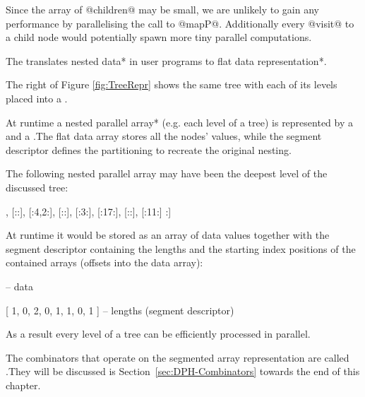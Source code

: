 \documentclass[preamble.tex]{subfiles}
\begin{document}
Since the array of @children@ may be small, we are unlikely to gain any performance by parallelising the call to @mapP@. Additionally every @visit@ to a child node would potentially spawn more tiny parallel computations. 

\begin{bluebox}
The  translates \*nested data* in user programs to \*flat data representation*.
\end{bluebox}

The right of Figure \ref{fig:TreeRepr} shows the same tree with each of its levels placed into a .

At runtime a \*nested parallel array* (e.g. each level of a tree) is represented by a  and a .\isegd The flat data array stores all the nodes' values, while the segment descriptor defines the partitioning to recreate the original nesting.

The following nested parallel array may have been the deepest level of the discussed tree:

\begin{hscode}
[: [:5:], [::], [:4,2:], [::], [:3:], [:17:], [::], [:11:] :]
\end{hscode}

At runtime it would be stored as an array of data values together with the segment descriptor containing the lengths and the starting index positions of the contained arrays (offsets into the data array):%

\begin{hscode}
[ 5, 4, 2, 3, 17, 11 ]       -- data

[ 1, 0, 2, 0, 1, 1, 0, 1 ]   -- lengths (segment descriptor)
\end{hscode}

As a result every level of a tree can be efficiently processed in parallel.

The combinators that operate on the segmented array representation are called .\isegcomb They will be discussed is Section~\ref{sec:DPH-Combinators} towards the end of this chapter.
\end{document}
